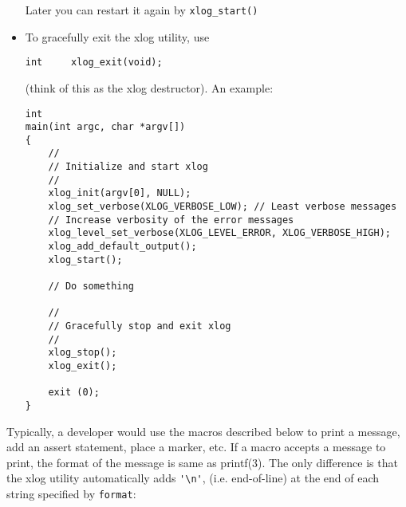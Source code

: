 \documentclass[11pt]{article}
\begin{document}
\begin{itemize}
	Later you can restart it again by \verb=xlog_start()=

  \item To gracefully exit the xlog utility, use

\begin{verbatim}
int     xlog_exit(void);
\end{verbatim}

	(think of this as the xlog destructor).
	An example:

\begin{verbatim}
int
main(int argc, char *argv[])
{
    //
    // Initialize and start xlog
    //
    xlog_init(argv[0], NULL);
    xlog_set_verbose(XLOG_VERBOSE_LOW);	// Least verbose messages
    // Increase verbosity of the error messages
    xlog_level_set_verbose(XLOG_LEVEL_ERROR, XLOG_VERBOSE_HIGH);
    xlog_add_default_output();
    xlog_start();

    // Do something

    //
    // Gracefully stop and exit xlog
    //
    xlog_stop();
    xlog_exit();

    exit (0);
}
\end{verbatim}

\end{itemize}


Typically, a developer would use the macros described below
to print a message, add an assert statement, place a marker, etc.
If a macro accepts a message to print, the format of the message is same
as printf(3). The only difference is that the xlog utility automatically
adds \verb='\n'=, (i.e. end-of-line) at the end of each string
specified by \verb=format=:
\end{document}
